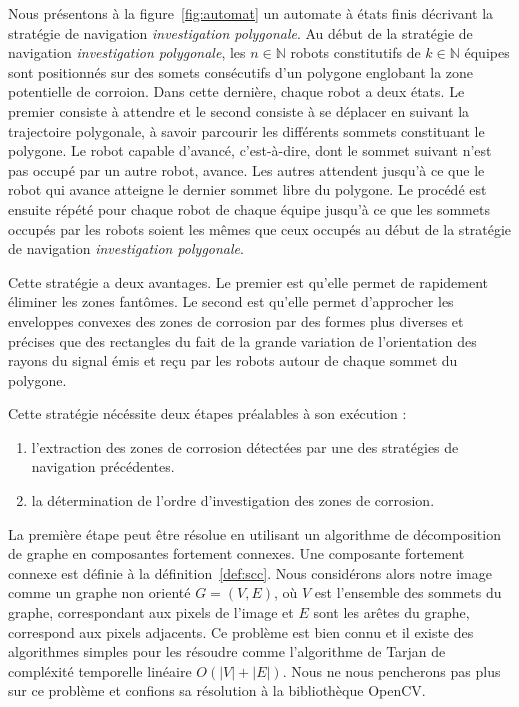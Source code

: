 \documentclass[francais,RandD]{rapportPFE}
\begin{document}
				Nous présentons à la figure~\ref{fig:automat} un automate à états finis décrivant la stratégie de navigation \textit{investigation polygonale}.
				Au début de la stratégie de navigation \textit{investigation polygonale}, les $n \in \mathbb{N}$ robots constitutifs de $k \in \mathbb{N}$ équipes sont positionnés sur des somets consécutifs d'un polygone englobant la zone potentielle de corroion.
				Dans cette dernière, chaque robot a deux états.
				Le premier consiste à attendre et le second consiste à se déplacer en suivant la trajectoire polygonale, à savoir parcourir les différents sommets constituant le polygone.
				Le robot capable d'avancé, c'est-à-dire, dont le sommet suivant n'est pas occupé par un autre robot, avance.
				Les autres attendent jusqu'à ce que le robot qui avance atteigne le dernier sommet libre du polygone.
				Le procédé est ensuite répété pour chaque robot de chaque équipe jusqu'à ce que les sommets occupés par les robots soient les mêmes que ceux occupés au début de la stratégie de navigation \textit{investigation polygonale}.

				Cette stratégie a deux avantages.
				Le premier est qu'elle permet de rapidement éliminer les zones fantômes.
				Le second est qu'elle permet d'approcher les enveloppes convexes des zones de corrosion par des formes plus diverses et précises que des rectangles du fait de la grande variation de l'orientation des rayons du signal émis et reçu par les robots autour de chaque sommet du polygone.

				Cette stratégie nécéssite deux étapes préalables à son exécution :
				\begin{enumerate}
					\item l'extraction des zones de corrosion détectées par une des stratégies de navigation précédentes.
					\item la détermination de l'ordre d'investigation des zones de corrosion.
				\end{enumerate}

				La première étape peut être résolue en utilisant un algorithme de décomposition de graphe en composantes fortement connexes.
				Une composante fortement connexe est définie à la définition~\ref{def:scc}.
				Nous considérons alors notre image comme un graphe non orienté $G = (V, E)$, où  $V$ est l'ensemble des sommets du graphe, correspondant aux pixels de l'image et $E$ sont les arêtes du graphe, correspond aux pixels adjacents.
				Ce problème est bien connu et il existe des algorithmes simples pour les résoudre comme l'algorithme de Tarjan de compléxité temporelle linéaire $O(|V| + |E|)$.
				Nous ne nous pencherons pas plus sur ce problème et confions sa résolution à la bibliothèque OpenCV.
\end{document}
